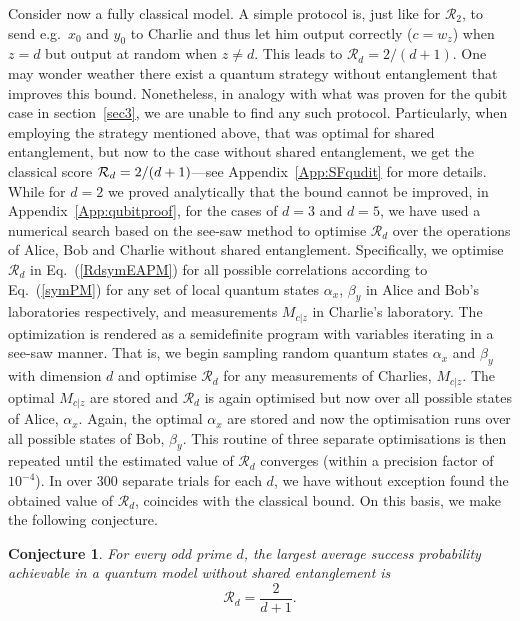 \documentclass[aps,superscriptaddress,twocolumn,twoside,floatfix,pra,nofootinbib,a4paper]{revtex4-2}
\newtheorem{conjecture}{Conjecture}
\begin{document}
Consider now a fully classical model. A simple protocol is, just like for $\mathcal{R}_2$, to send e.g.~$x_0$ and $y_0$ to Charlie and thus let him output correctly ($c=w_z$) when $z=d$ but output at random when $z\neq d$. This leads to $\mathcal{R}_d=2/(d+1)$. One may wonder weather there exist a quantum strategy without entanglement that improves this bound.
Nonetheless, in analogy with what was proven for the qubit case in section~\ref{sec3}, we are unable to find any such protocol.  
Particularly, when employing the strategy mentioned above, that was optimal for shared entanglement, but now to  the case without shared entanglement, we get the classical score ${\cal R}_d = 2/(d+1)$---see Appendix~\ref{App:SFqudit} for more details.
While for $d=2$ we proved analytically that the bound cannot be improved, in Appendix~\ref{App:qubitproof}, for the cases of $d=3$ and $d=5$, we have used a numerical search based on the see-saw method \cite{tavakoli2023semidefinite} to optimise $\mathcal{R}_d$ over the operations of Alice, Bob and Charlie without shared entanglement. Specifically, we optimise $\mathcal{R}_d$ in Eq.~(\ref{RdsymEAPM}) for all possible correlations according to Eq.~(\ref{symPM}) for any set of local quantum states $\alpha_x$, $\beta_y$ in Alice and Bob’s laboratories respectively, and measurements $M_{c|z}$ in Charlie’s laboratory. The optimization is rendered as a semidefinite program with variables iterating in a see-saw manner. That is, we begin sampling random quantum states $\alpha_x$ and $\beta_y$ with dimension $d$ and optimise $\mathcal{R}_d$ for any measurements of Charlies, $M_{c|z}$. The optimal $M_{c|z}$ are stored and $\mathcal{R}_d$ is again optimised but now over all possible states of Alice, $\alpha_x$. Again, the optimal $\alpha_x$ are stored and now the optimisation runs over all possible states of Bob, $\beta_y$. This routine of three separate optimisations is then repeated until the estimated value of $\mathcal{R}_d$ converges (within a precision factor of  $10^{-4}$). In over $300$ separate trials for each $d$, we have without exception found the obtained value of $\mathcal{R}_d$, coincides with the classical bound. On this basis, we make the following conjecture.


\begin{conjecture}\label{Conj}
	For every odd prime $d$, the largest average success probability achievable in a quantum model without shared entanglement is
	\begin{equation}\label{conj}
	\mathcal{R}_d =\frac{2}{d+1}.
	\end{equation}
\end{conjecture}
\end{document}
